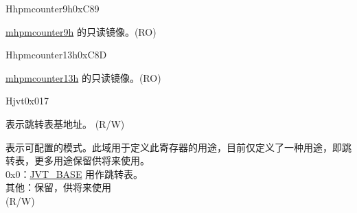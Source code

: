\begin{register}{H}{hpmcounter9h}{0xC89}\label{regdesc:HPMCOUNTER9H}
%
\regnewline%
\begin{regdesc}\begin{reglist}
\label{fielddesc:HPMCOUNTER9H}\item [HPMCOUNTER9H] \hyperref[regdesc:MHPMCOUNTER9H]{mhpmcounter9h} 的只读镜像。(RO)
\end{reglist}\end{regdesc}
\end{register}


\begin{register}{H}{hpmcounter13h}{0xC8D}\label{regdesc:HPMCOUNTER13H}
%
\regnewline%
\begin{regdesc}\begin{reglist}
\label{fielddesc:HPMCOUNTER13H}\item [HPMCOUNTER13H] \hyperref[regdesc:MHPMCOUNTER13H]{mhpmcounter13h} 的只读镜像。(RO)
\end{reglist}\end{regdesc}
\end{register}





\begin{register}{H}{jvt}{0x017}\label{regdesc:JVT}%
%
%
\regnewline%
\begin{regdesc}\begin{reglist}
\label{fielddesc:JVT_BASE}\item [BASE] 表示跳转表基地址。 (R/W)
\label{fielddesc:JVT_MODE}\item [MODE] 表示可配置的模式。此域用于定义此寄存器的用途，目前仅定义了一种用途，即跳转表，更多用途保留供将来使用。\\
0x0：\hyperref[fielddesc:JVT_BASE]{JVT\_BASE} 用作跳转表。\\
其他：保留，供将来使用\\
(R/W)
\end{reglist}\end{regdesc}
\end{register}

